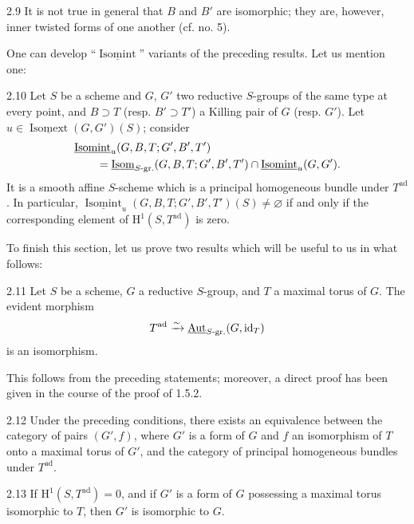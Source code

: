 \begin{remark}{2.9}\label{XXIV.2.9}
It is not true in general that $B$ and $B'$ are isomorphic; they are, however, inner twisted forms of one another (cf. no. 5).
\end{remark}
One can develop ``$\underline{\operatorname{Isomint}}$'' variants of the preceding results. Let us mention one:
\begin{proposition}{2.10}\label{XXIV.2.10}
Let $S$ be a scheme and $G$, $G'$ two reductive $S$-groups of the same type at every point, and $B\supset T$ (resp. $B'\supset T'$) a Killing pair of $G$ (resp. $G'$). Let $u\in\underline{\operatorname{Isomext}}(G,G')(S)$; consider
\[
\begin{aligned}
&\underline{\operatorname{Isomint}}_u(G,B,T;G',B',T')\\
&\qquad=\underline{\operatorname{Isom}}_{S\text{-gr.}}(G,B,T;G',B',T')\cap\underline{\operatorname{Isomint}}_u(G,G').
\end{aligned}
\]
It is a smooth affine $S$-scheme which is a principal homogeneous bundle under $T^{\mathrm{ad}}$. In particular, $\underline{\operatorname{Isomint}}_u(G,B,T;G',B',T')(S)\ne\varnothing$ if and only if the corresponding element of $\mathrm H^1(S,T^{\mathrm{ad}})$ is zero.
\end{proposition}
To finish this section, let us prove two results which will be useful to us in what follows:
\begin{proposition}{2.11}\label{XXIV.2.11}
Let $S$ be a scheme, $G$ a reductive $S$-group, and $T$ a maximal torus of $G$. The evident morphism
\[
T^{\mathrm{ad}}\xrightarrow{\sim}\underline{\operatorname{Aut}}_{S\text{-gr.}}(G,\mathrm{id}_T)
\]
is an isomorphism.
\end{proposition}
This follows from the preceding statements; moreover, a direct proof has been given in the course of the proof of 1.5.2.
\begin{corollary}{2.12}\label{XXIV.2.12}
Under the preceding conditions, there exists an equivalence between the category of pairs $(G',f)$, where $G'$ is a form of $G$ and $f$ an isomorphism of $T$ onto a maximal torus of $G'$, and the category of principal homogeneous bundles under $T^{\mathrm{ad}}$.
\end{corollary}
\begin{corollary}{2.13}\label{XXIV.2.13}
If $\mathrm H^1(S,T^{\mathrm{ad}})=0$, and if $G'$ is a form of $G$ possessing a maximal torus isomorphic to $T$, then $G'$ is isomorphic to $G$.
\end{corollary}
